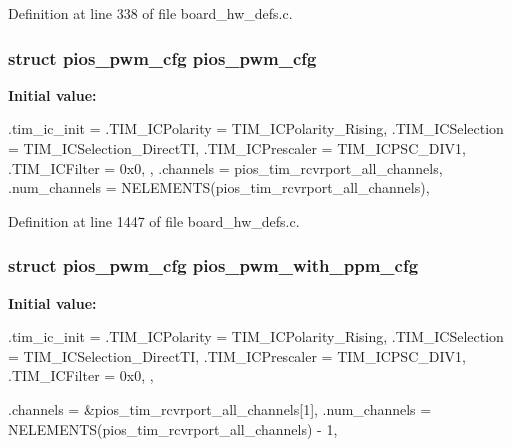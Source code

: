 \-Definition at line 338 of file board\-\_\-hw\-\_\-defs.\-c.

\hypertarget{group___flying_f4_ga7587f8e174df90bef8cec1edfa9e14c1}{
\subsubsection[{pios\-\_\-pwm\-\_\-cfg}]{\setlength{\rightskip}{0pt plus 5cm}struct {\bf pios\-\_\-pwm\-\_\-cfg} {\bf pios\-\_\-pwm\-\_\-cfg}}}\label{group___flying_f4_ga7587f8e174df90bef8cec1edfa9e14c1}
{\bfseries \-Initial value\-:}
\begin{DoxyCode}
 {
        .tim_ic_init = {
                .TIM_ICPolarity = TIM_ICPolarity_Rising,
                .TIM_ICSelection = TIM_ICSelection_DirectTI,
                .TIM_ICPrescaler = TIM_ICPSC_DIV1,
                .TIM_ICFilter = 0x0,
        },
        .channels = pios_tim_rcvrport_all_channels,
        .num_channels = NELEMENTS(pios_tim_rcvrport_all_channels),
}
\end{DoxyCode}


\-Definition at line 1447 of file board\-\_\-hw\-\_\-defs.\-c.

\hypertarget{group___flying_f4_ga6a7a8338c617f18384f3b3c5678f5505}{
\subsubsection[{pios\-\_\-pwm\-\_\-with\-\_\-ppm\-\_\-cfg}]{\setlength{\rightskip}{0pt plus 5cm}struct {\bf pios\-\_\-pwm\-\_\-cfg} {\bf pios\-\_\-pwm\-\_\-with\-\_\-ppm\-\_\-cfg}}}\label{group___flying_f4_ga6a7a8338c617f18384f3b3c5678f5505}
{\bfseries \-Initial value\-:}
\begin{DoxyCode}
 {
        .tim_ic_init = {
                .TIM_ICPolarity = TIM_ICPolarity_Rising,
                .TIM_ICSelection = TIM_ICSelection_DirectTI,
                .TIM_ICPrescaler = TIM_ICPSC_DIV1,
                .TIM_ICFilter = 0x0,
        },
        
        .channels = &pios_tim_rcvrport_all_channels[1],
        .num_channels = NELEMENTS(pios_tim_rcvrport_all_channels) - 1,
}
\end{DoxyCode}


